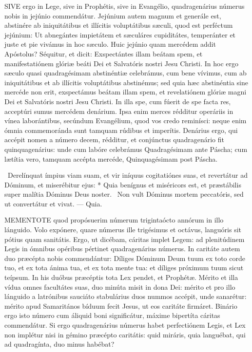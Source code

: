 \lettrine[lines=2]{S}{IVE} ergo in Lege, sive in Prophétis, sive in Evangélio, quadragenárius númerus nobis in jejúnio commendátur. Jejúnium autem magnum et generále est, abstinére ab iniquitátibus et illícitis voluptátibus sæculi, quod est perféctum jejúnium: Ut abnegántes impietátem et sæculáres cupiditátes, temperánter et juste et pie vivámus in hoc sæculo. Huic jejúnio quam mercédem addit Apóstolus? Séquitur, et dicit: Exspectántes illam beátam spem, et manifestatiónem glóriæ beáti Dei et Salvatóris nostri Jesu Christi. In hoc ergo sæculo quasi quadragésimam abstinéntiæ celebrámus, cum bene vívimus, cum ab iniquitátibus et ab illícitis voluptátibus abstinémus; sed quia hæc abstinéntia sine mercéde non erit, exspectámus beátam illam spem, et revelatiónem glóriæ magni Dei et Salvatóris nostri Jesu Christi. In illa spe, cum fúerit de spe facta res, acceptúri sumus mercédem denárium. Ipsa enim merces rédditur operáriis in vínea laborántibus, secúndum Evangélium, quod vos credo reminísci: neque enim ómnia commemoránda sunt tamquam rúdibus et imperítis. Denárius ergo, qui accépit nomen a número decem, rédditur, et conjúnctus quadragenário fit quinquagenárius: unde cum labóre celebrámus Quadragésimam ante Páscha; cum lætítia vero, tamquam accépta mercéde, Quinquagésimam post Páscha.

\R\ Derelínquat ímpius viam suam, et vir iníquus cogitatiónes suas, et revertátur ad Dóminum, et miserébitur ejus: * Quia benígnus et miséricors est, et præstábilis super malítia Dóminus Deus noster. \V\ Non vult Dóminus mortem peccatóris, sed ut convertátur et vivat. --- Quia.


\lettrine[lines=2]{M}{EMENTOTE} quod propósuerim númerum trigintaócto annórum in illo lánguido. Volo expónere, quare númerus ille trigésimus et octávus, languóris sit pótius quam sanitátis. Ergo, ut dicébam, cáritas implet Legem: ad plenitúdinem Legis in ómnibus opéribus pértinet quadragenárius númerus. In caritáte autem duo præcépta nobis commendántur: Díliges Dóminum Deum tuum ex toto corde tuo, et ex tota ánima tua, et ex tota mente tua: et díliges próximum tuum sicut teípsum. In his duóbus præcéptis tota Lex pendet, et Prophétæ. Mérito et illa vídua omnes facultátes suas, duo minúta misit in dona Dei: mérito et pro illo lánguido a latrónibus sauciáto stabulárius duos nummos accépit, unde sanarétur: mérito apud Samaritános bíduum fecit Jesus, ut eos caritáte firmáret. Binário ergo isto número cum áliquid boni significátur, máxime bipertíta cáritas commendátur. Si ergo quadragenárius númerus habet perfectiónem Legis, et Lex non implétur nisi in gémino præcépto caritátis: quid miráris, quia languébat, qui ad quadragínta, duo minus habébat?

